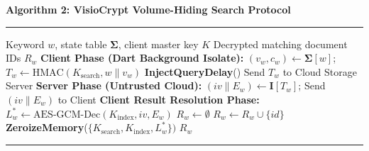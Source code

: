 \documentclass[preview,varwidth=88mm]{standalone}
\begin{document}
\noindent\textbf{Algorithm 2: VisioCrypt Volume-Hiding Search Protocol}
\vspace{1mm}\hrule\vspace{1mm}
\begin{algorithmic}[1]
\Require Keyword $w$, state table $\mathbf{\Sigma}$, client master key $K$
\Ensure Decrypted matching document IDs $R_w$
\State \textbf{Client Phase (Dart Background Isolate):}
\State $(v_w, c_w) \leftarrow \mathbf{\Sigma}[w]$; $T_w \leftarrow \text{HMAC}(K_{\text{search}}, w \parallel v_w)$
\State \textbf{InjectQueryDelay}() 
\State Send $T_w$ to Cloud Storage Server
\State \textbf{Server Phase (Untrusted Cloud):}
\State $(iv \parallel E_w) \leftarrow \mathbf{I}[T_w]$; Send $(iv \parallel E_w)$ to Client
\State \textbf{Client Result Resolution Phase:}
\State $L_w^* \leftarrow \text{AES-GCM-Dec}(K_{\text{index}}, iv, E_w)$
\State $R_w \leftarrow \emptyset$
        \State $R_w \leftarrow R_w \cup \{id\}$
    \EndIf
\EndFor
\State \textbf{ZeroizeMemory}($\{K_{\text{search}}, K_{\text{index}}, L_w^*\})$
\State \Return $R_w$
\end{algorithmic}
\vspace{1mm}\hrule
\end{document}
